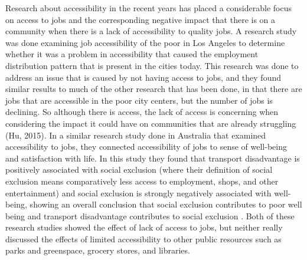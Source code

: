 \documentclass[3p, authoryear]{elsarticle} %
\begin{document}
Research about accessibility in the recent years has placed a considerable focus
on access to jobs and the corresponding negative impact that there is on a
community when there is a lack of accessibility to quality jobs. A research
study was done examining job accessibility of the poor in Los Angeles to
determine whether it was a problem in accessibility that caused the employment
distribution pattern that is present in the cities today. This research was done
to address an issue that is caused by not having access to jobs, and they found
similar results to much of the other research that has been done, in that there
are jobs that are accessible in the poor city centers, but the number of jobs is
declining. So although there is access, the lack of access is concerning when
considering the impact it could have on communities that are already struggling
(Hu, 2015). In a similar research study done in Australia that examined
accessibility to jobs, they connected accessibility of jobs to sense of
well-being and satisfaction with life. In this study they found that transport
disadvantage is positively associated with social exclusion (where their
definition of social exclusion means comparatively less access to employment,
shops, and other entertainment) and social exclusion is strongly negatively
associated with well-being, showing an overall conclusion that social exclusion
contributes to poor well being and transport disadvantage contributes to social
exclusion \citep{currie2010modeling}. Both of these research studies showed the
effect of lack of access to jobs, but neither really discussed the effects of
limited accessibility to other public resources such as parks and greenspace,
grocery stores, and libraries.
\end{document}
